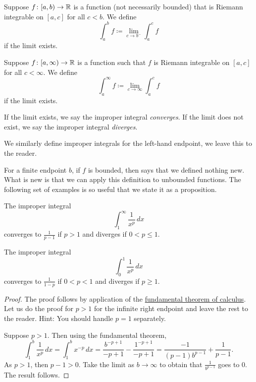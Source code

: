 \begin{defn}
Suppose $f \colon [a,b) \to {\mathbb{R}}$ is a function (not necessarily bounded)
that is Riemann integrable on $[a,c]$ for all $c < b$.  We define
\begin{equation*}
\int_a^b f \coloneqq \lim_{c \to b^-} \int_a^{c} f
\end{equation*}
if the limit exists.

Suppose $f \colon [a,\infty) \to {\mathbb{R}}$ is a function such that
$f$ is Riemann integrable on $[a,c]$ for all $c < \infty$.  
We define
\begin{equation*}
\int_a^\infty f \coloneqq \lim_{c \to \infty} \int_a^c f
\end{equation*}
if the limit exists.

If the limit exists, we say the improper integral
\emph{converges}.
If the limit does not exist, we say the improper integral
\emph{diverges}.

We similarly define improper integrals for the left-hand endpoint, we leave
this to the reader.
\end{defn}

For a finite endpoint $b$, if $f$ is bounded,
then
 says that we defined nothing new.  What is new is that
we can apply this definition to unbounded functions.
The following set of examples is
so useful that we state it as a proposition.

\begin{prop}%
\label{impropriemann:ptest}
The improper integral
\begin{equation*}
\int_1^\infty \frac{1}{x^p} \,dx
\end{equation*}
converges to $\frac{1}{p-1}$ if $p > 1$ and diverges if $0 < p \leq 1$.

The improper integral
\begin{equation*}
\int_0^1 \frac{1}{x^p} \,dx
\end{equation*}
converges to $\frac{1}{1-p}$ if $0 < p < 1$ and diverges if $p \geq 1$.
\end{prop}

\begin{proof}
The proof follows by application of the
\hyperref[thm:FTCv1]{fundamental theorem of calculus}.
Let us do the proof for $p > 1$ for the infinite right endpoint and
leave the rest to the reader.  Hint: You should handle $p=1$
separately.

Suppose $p > 1$.  Then
using the fundamental theorem,
\begin{equation*}
\int_1^b \frac{1}{x^p} \,dx
=
\int_1^b x^{-p} \,dx
=
\frac{b^{-p+1}}{-p+1}
-
\frac{1^{-p+1}}{-p+1}
=
\frac{-1}{(p-1)b^{p-1}}
+
\frac{1}{p-1} .
\end{equation*}
As $p > 1$, then $p-1 > 0$.  Take the limit as $b \to \infty$
to obtain that $\frac{1}{b^{p-1}}$ goes to 0.  The result follows.
\end{proof}

